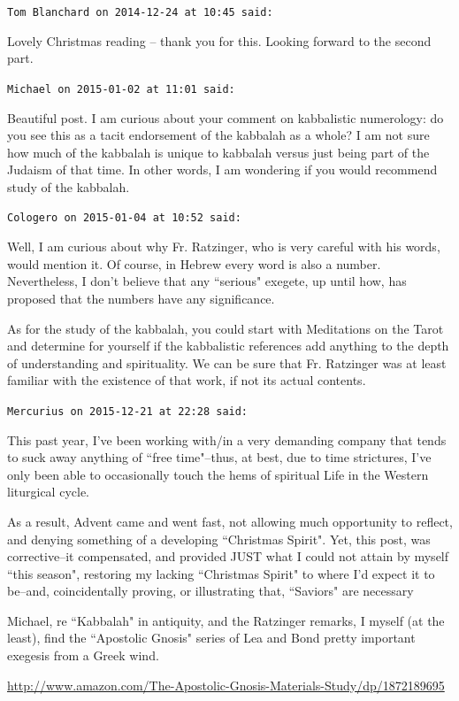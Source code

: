 \begin{footnotesize}\begin{sffamily}



\texttt{Tom Blanchard on 2014-12-24 at 10:45 said: }

Lovely Christmas reading – thank you for this. Looking forward to the second part.


\hfill

\texttt{Michael on 2015-01-02 at 11:01 said: }

Beautiful post. I am curious about your comment on kabbalistic numerology: do you see this as a tacit endorsement of the kabbalah as a whole? I am not sure how much of the kabbalah is unique to kabbalah versus just being part of the Judaism of that time. In other words, I am wondering if you would recommend study of the kabbalah.


\hfill

\texttt{Cologero on 2015-01-04 at 10:52 said: }

Well, I am curious about why Fr. Ratzinger, who is very careful with his words, would mention it. Of course, in Hebrew every word is also a number. Nevertheless, I don't believe that any ``serious" exegete, up until how, has proposed that the numbers have any significance.

As for the study of the kabbalah, you could start with Meditations on the Tarot and determine for yourself if the kabbalistic references add anything to the depth of understanding and spirituality. We can be sure that Fr. Ratzinger was at least familiar with the existence of that work, if not its actual contents.


\hfill

\texttt{Mercurius on 2015-12-21 at 22:28 said: }

This past year, I've been working with/in a very demanding company that tends to suck away anything of ``free time"–thus, at best, due to time strictures, I've only been able to occasionally touch the hems of spiritual Life in the Western liturgical cycle. 

As a result, Advent came and went fast, not allowing much opportunity to reflect, and denying something of a developing ``Christmas Spirit". Yet, this post, was corrective–it compensated, and provided JUST what I could not attain by myself ``this season", restoring my lacking ``Christmas Spirit" to where I'd expect it to be–and, coincidentally proving, or illustrating that, ``Saviors" are necessary

Michael, re ``Kabbalah" in antiquity, and the Ratzinger remarks, I myself (at the least), find the ``Apostolic Gnosis" series of Lea and Bond pretty important exegesis from a Greek wind. 

\url{http://www.amazon.com/The-Apostolic-Gnosis-Materials-Study/dp/1872189695}


\end{sffamily}\end{footnotesize}

